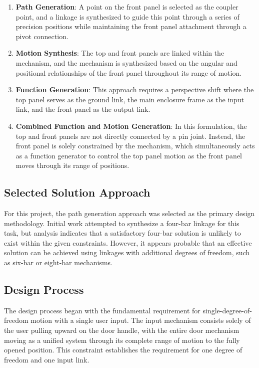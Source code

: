 \documentclass[12pt]{article}
\begin{document}
\begin{enumerate}
    \item \textbf{Path Generation}: A point on the front panel is selected as the coupler point, and a linkage is synthesized to guide this point through a series of precision positions while maintaining the front panel attachment through a pivot connection.
    
    \item \textbf{Motion Synthesis}: The top and front panels are linked within the mechanism, and the mechanism is synthesized based on the angular and positional relationships of the front panel throughout its range of motion.
    
    \item \textbf{Function Generation}: This approach requires a perspective shift where the top panel serves as the ground link, the main enclosure frame as the input link, and the front panel as the output link.
    
    \item \textbf{Combined Function and Motion Generation}: In this formulation, the top and front panels are not directly connected by a pin joint. Instead, the front panel is solely constrained by the mechanism, which simultaneously acts as a function generator to control the top panel motion as the front panel moves through its range of positions.
\end{enumerate}

\subsection{Selected Solution Approach}
\label{sec:selected_approach}

For this project, the path generation approach was selected as the primary design methodology. Initial work attempted to synthesize a four-bar linkage for this task, but analysis indicates that a satisfactory four-bar solution is unlikely to exist within the given constraints. However, it appears probable that an effective solution can be achieved using linkages with additional degrees of freedom, such as six-bar or eight-bar mechanisms.

\subsection{Design Process}
\label{sec:design_process}

The design process began with the fundamental requirement for single-degree-of-freedom motion with a single user input. The input mechanism consists solely of the user pulling upward on the door handle, with the entire door mechanism moving as a unified system through its complete range of motion to the fully opened position. This constraint establishes the requirement for one degree of freedom and one input link.
\end{document}
